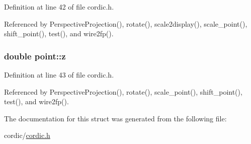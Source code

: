 Definition at line 42 of file cordic.\-h.



Referenced by Perspective\-Projection(), rotate(), scale2display(), scale\-\_\-point(), shift\-\_\-point(), test(), and wire2fp().

\hypertarget{structpoint_aab1f0c3682401083b5bf252e7001874f}{
\subsubsection[{z}]{\setlength{\rightskip}{0pt plus 5cm}double point\-::z}}\label{structpoint_aab1f0c3682401083b5bf252e7001874f}


Definition at line 43 of file cordic.\-h.



Referenced by Perspective\-Projection(), rotate(), scale\-\_\-point(), shift\-\_\-point(), test(), and wire2fp().



The documentation for this struct was generated from the following file\-:\begin{DoxyCompactItemize}
\item 
cordic/\hyperlink{cordic_8h}{cordic.\-h}\end{DoxyCompactItemize}
